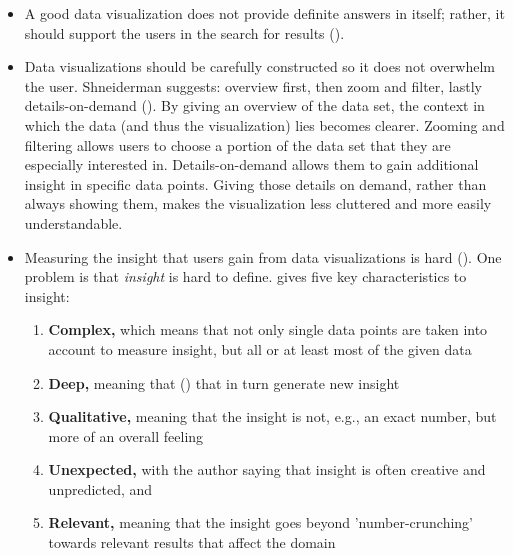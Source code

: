 \begin{itemize}
    \item A good data visualization does not provide definite answers in itself; rather, it should support the users in the search for results (\cite{light2001portable}).
    \item Data visualizations should be carefully constructed so it does not overwhelm the user. Shneiderman suggests: overview first, then zoom and filter, lastly details-on-demand (\cite{shneidermanEyesHaveIt1996}). By giving an overview of the data set, the context in which the data (and thus the visualization) lies becomes clearer. Zooming and filtering allows users to choose a portion of the data set that they are especially interested in. Details-on-demand allows them to gain additional insight in specific data points. Giving those details on demand, rather than always showing them, makes the visualization less cluttered and more easily understandable.
    \item Measuring the insight that users gain from data visualizations is hard (\cite{northMeasuringVisualizationInsight2006}). One problem is that \emph{insight} is hard to define. \citeauthor{northMeasuringVisualizationInsight2006} gives five key characteristics to insight:
    \begin{enumerate}
        \item \textbf{Complex,} which means that not only single data points are taken into account to measure insight, but all or at least most of the given data
        \item \textbf{Deep,} meaning that  (\cite[6]{northMeasuringVisualizationInsight2006}) that in turn generate new insight
        \item \textbf{Qualitative,} meaning that the insight is not, e.g., an exact number, but more of an overall feeling
        \item \textbf{Unexpected,} with the author saying that insight is often creative and unpredicted, and
        \item \textbf{Relevant,} meaning that the insight goes beyond 'number-crunching' towards relevant results that affect the domain
    \end{enumerate}
\end{itemize}
